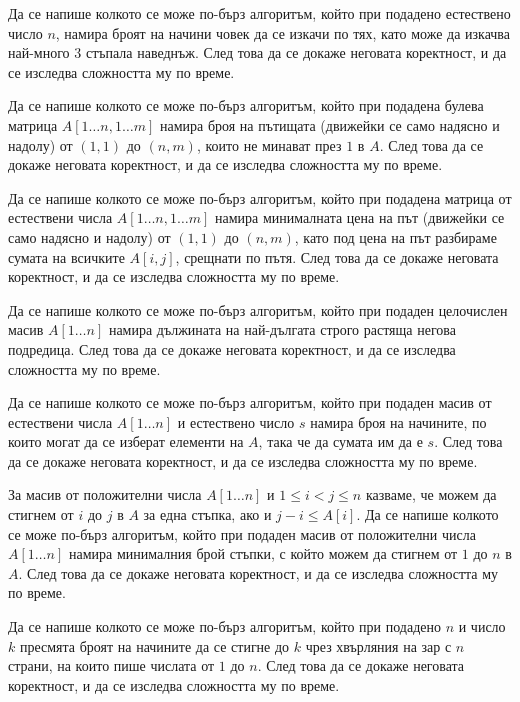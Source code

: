\begin{problem}
Да се напише колкото се може по-бърз алгоритъм, който при подадено естествено число $n$, намира броят на начини човек да се изкачи по тях, като може да изкачва най-много $3$ стъпала наведнъж.
След това да се докаже неговата коректност, и да се изследва сложността му по време.
\end{problem}

\begin{problem}
Да се напише колкото се може по-бърз алгоритъм, който при подадена булева матрица $A[1 \dots n, 1 \dots m]$ намира броя на пътищата (движейки се само надясно и надолу) от $(1, 1)$ до $(n, m)$, които не минават през $1$ в $A$.
След това да се докаже неговата коректност, и да се изследва сложността му по време.
\end{problem}

\begin{problem}
Да се напише колкото се може по-бърз алгоритъм, който при подадена матрица от естествени числа $A[1 \dots n, 1 \dots m]$ намира минималната цена на път (движейки се само надясно и надолу) от $(1, 1)$ до $(n, m)$, като под цена на път разбираме сумата на всичките $A[i, j]$, срещнати по пътя.
След това да се докаже неговата коректност, и да се изследва сложността му по време.
\end{problem}


\begin{problem}
Да се напише колкото се може по-бърз алгоритъм, който при подаден целочислен масив $A[1 \dots n]$ намира дължината на най-дългата строго растяща негова подредица.
След това да се докаже неговата коректност, и да се изследва сложността му по време.
\end{problem}

\begin{problem}
Да се напише колкото се може по-бърз алгоритъм, който при подаден масив от естествени числа $A[1 \dots n]$ и естествено число $s$ намира броя на начините, по които могат да се изберат елементи на $A$, така че да сумата им да е $s$.
След това да се докаже неговата коректност, и да се изследва сложността му по време.
\end{problem}

\begin{problem}
За масив от положителни числа $A[1 \dots n]$ и $1 \leq i < j \leq n$ казваме, че можем да стигнем от $i$ до $j$ в $A$ за една стъпка, ако и $j - i \leq A[i]$.
Да се напише колкото се може по-бърз алгоритъм, който при подаден масив от положителни числа $A[1 \dots n]$ намира минималния брой стъпки, с който можем да стигнем от $1$ до $n$ в $A$.
След това да се докаже неговата коректност, и да се изследва сложността му по време.
\end{problem}

\begin{problem}
Да се напише колкото се може по-бърз алгоритъм, който при подадено $n$ и число $k$ пресмята броят на начините да се стигне до $k$ чрез хвърляния на зар с $n$ страни, на които пише числата от $1$ до $n$.
След това да се докаже неговата коректност, и да се изследва сложността му по време.
\end{problem}